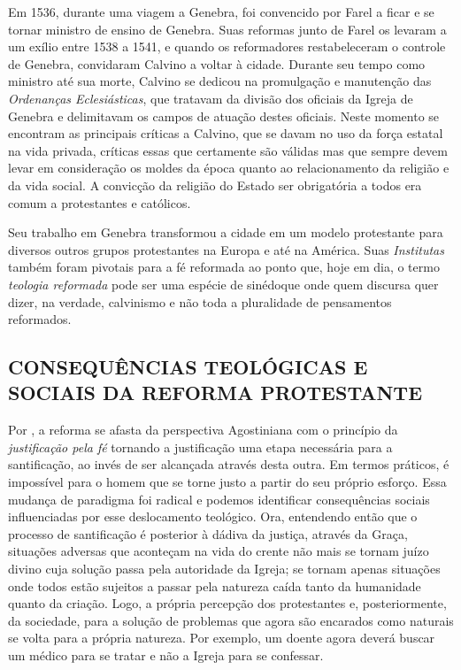 \documentclass[
    article,            %
	12pt,				%
	oneside,			%
	a4paper,			%
	chapter=TITLE,		%
	section=TITLE,		%
	english,			%
	french,				%
	spanish,			%
	brazil				%
	]{abntex2}
\begin{document}
Em 1536, durante uma viagem a Genebra, foi convencido por Farel a ficar e se tornar ministro de ensino de Genebra. Suas reformas junto de Farel os levaram a um exílio entre 1538 a 1541, e quando os reformadores restabeleceram o controle de Genebra, convidaram Calvino a voltar à cidade. Durante seu tempo como ministro até sua morte, Calvino se dedicou na promulgação e manutenção das \emph{Ordenanças Eclesiásticas}, que tratavam da divisão dos oficiais da Igreja de Genebra e delimitavam os campos de atuação destes oficiais. Neste momento se encontram as principais críticas a Calvino, que se davam no uso da força estatal na vida privada, críticas essas que certamente são válidas mas que sempre devem levar em consideração os moldes da época quanto ao relacionamento da religião e da vida social. A convicção da religião do Estado ser obrigatória a todos era comum a protestantes e católicos. 

Seu trabalho em Genebra transformou a cidade em um modelo protestante para diversos outros grupos protestantes na Europa e até na América. Suas \emph{Institutas} também foram pivotais para a fé reformada ao ponto que, hoje em dia, o termo \emph{teologia reformada} pode ser uma espécie de sinédoque onde quem discursa quer dizer, na verdade, calvinismo e não toda a pluralidade de pensamentos reformados.

\subsection{CONSEQUÊNCIAS TEOLÓGICAS E SOCIAIS DA REFORMA PROTESTANTE}
Por , a reforma se afasta da perspectiva Agostiniana com o princípio da \emph{justificação pela fé} tornando a justificação uma etapa necessária para a santificação, ao invés de ser alcançada através desta outra. Em termos práticos, é impossível para o homem que se torne justo a partir do seu próprio esforço. Essa mudança de paradigma foi radical e podemos identificar consequências sociais influenciadas por esse deslocamento teológico. Ora, entendendo então que o processo de santificação é posterior à dádiva da justiça, através da Graça, situações adversas que aconteçam na vida do crente não mais se tornam juízo divino cuja solução passa pela autoridade da Igreja; se tornam apenas situações onde todos estão sujeitos a passar pela natureza caída tanto da humanidade quanto da criação. Logo, a própria percepção dos protestantes e, posteriormente, da sociedade, para a solução de problemas que agora são encarados como naturais se volta para a própria natureza. Por exemplo, um doente agora deverá buscar um médico para se tratar e não a Igreja para se confessar.
\end{document}
